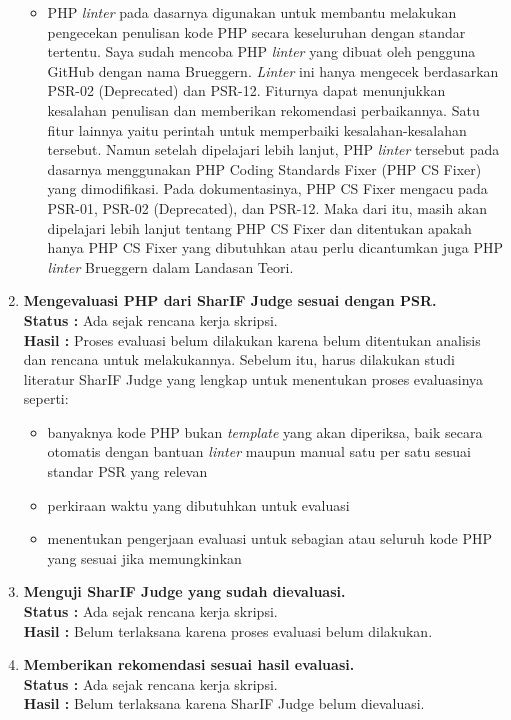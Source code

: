 \documentclass[a4paper,twoside]{article}
\begin{document}
\begin{enumerate}
\begin{itemize}
			\item PHP \textit{linter} pada dasarnya digunakan untuk membantu melakukan pengecekan penulisan kode PHP secara keseluruhan dengan standar tertentu. Saya sudah mencoba PHP \textit{linter} yang dibuat oleh pengguna GitHub dengan nama Brueggern. \textit{Linter} ini hanya mengecek berdasarkan PSR-02 (Deprecated) dan PSR-12. Fiturnya dapat menunjukkan kesalahan penulisan dan memberikan rekomendasi perbaikannya. Satu fitur lainnya yaitu perintah untuk memperbaiki kesalahan-kesalahan tersebut. Namun setelah dipelajari lebih lanjut, PHP \textit{linter} tersebut pada dasarnya menggunakan PHP Coding Standards Fixer (PHP CS Fixer) yang dimodifikasi. Pada dokumentasinya, PHP CS Fixer mengacu pada PSR-01, PSR-02 (Deprecated), dan PSR-12. Maka dari itu, masih akan dipelajari lebih lanjut tentang PHP CS Fixer dan ditentukan apakah hanya PHP CS Fixer yang dibutuhkan atau perlu dicantumkan juga PHP \textit{linter} Brueggern dalam  Landasan Teori. 
		\end{itemize}
		  

		\item \textbf{Mengevaluasi PHP dari SharIF Judge sesuai dengan PSR.}\\
		{\bf Status :} Ada sejak rencana kerja skripsi.\\
		{\bf Hasil :} Proses evaluasi belum dilakukan karena belum ditentukan analisis dan rencana untuk melakukannya. Sebelum itu, harus dilakukan studi literatur SharIF Judge yang lengkap untuk menentukan proses evaluasinya seperti: 
		\begin{itemize}
			\item banyaknya kode PHP bukan \textit{template} yang akan diperiksa, baik secara otomatis dengan bantuan \textit{linter} maupun manual satu per satu sesuai standar PSR yang relevan 
			\item perkiraan waktu yang dibutuhkan untuk evaluasi
			\item menentukan pengerjaan evaluasi untuk sebagian atau seluruh kode PHP yang sesuai jika memungkinkan 
		\end{itemize}
		

		\item \textbf{Menguji SharIF Judge yang sudah dievaluasi.}\\
		{\bf Status :} Ada sejak rencana kerja skripsi.\\
		{\bf Hasil :} Belum terlaksana karena proses evaluasi belum dilakukan. 

		\item \textbf{Memberikan rekomendasi sesuai hasil evaluasi.}\\
		{\bf Status :} Ada sejak rencana kerja skripsi.\\
		{\bf Hasil :} Belum terlaksana karena SharIF Judge belum dievaluasi.


\end{enumerate}
\end{document}
